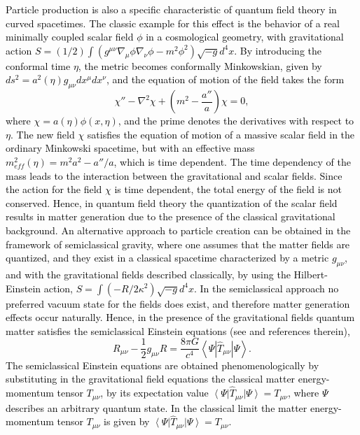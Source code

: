 \documentclass[aps,superscriptaddress, showpacs,preprintnumbers, superscriptaddress, nofootinbibt,twocolumn]{revtex4}
\def\be{\begin{equation}}
\def\ee{\end{equation}}
\newcommand{\te}[1]{\textcolor{black}{#1}}
\begin{document}
\te{Particle production is also a specific characteristic of quantum field theory in curved spacetimes. The classic example for this effect is the behavior of a real minimally coupled  scalar field $\phi$ in a cosmological geometry, with gravitational action $S=(1/2)\int{\left(g^{\mu \nu}\nabla _{\mu}\phi \nabla _{\nu}\phi-m^2\phi^2\right)\sqrt{-g}d^4x}$. By introducing the conformal time $\eta$, the metric becomes conformally Minkowskian, given by $ds^2=a^2(\eta)g_{\mu \nu}dx^{\mu}dx^{\nu}$, and the equation of motion of the field takes the form \cite{Toms}
\be
\chi '' -\nabla ^2 \chi +\left(m^2-\frac{a''}{a}\right)\chi=0,
\ee 
where $\chi =a(\eta)\phi (x,\eta)$, and the prime denotes the derivatives with respect to $\eta$. The new field $\chi $ satisfies the equation of
motion of a massive scalar field in the ordinary Minkowski spacetime, but with an effective mass $m_{eff}^2(\eta)=m^2a^2-a''/a$, which is time dependent. The time dependency of the mass leads to the interaction between the gravitational and scalar fields. Since the action for the field $\chi$ is time dependent,  the total energy of the field is not conserved. Hence, in quantum field theory
the quantization of the scalar field results in matter generation due to the presence of the classical gravitational background.}
\te{
An alternative approach to particle creation can be obtained in the framework of semiclassical gravity,  where one assumes that the matter fields are quantized, and they exist in a classical spacetime characterized by a metric $g_{\mu \nu}$, and with the gravitational fields described classically, by using the Hilbert-Einstein action, $S=\int{\left(-R/2\kappa ^2\right)\sqrt{-g}d^4x}$. In the semiclassical approach no preferred vacuum state for the fields does exist, and therefore matter generation effects occur naturally. Hence, in the presence of the gravitational fields quantum matter satisfies the semiclassical Einstein equations (see \cite{Phys} and references therein),
\be\label{1q}
R_{\mu \nu}-\frac{1}{2}g_{\mu \nu}R=\frac{8\pi G}{c^4}\left\langle\Psi\left|\hat{T}_{\mu\nu}\right|\Psi \right\rangle.
\ee
 The semiclassical Einstein  equations are obtained phenomenologically by substituting in the gravitational field equations the classical matter energy-momentum tensor $T_{\mu\nu}$, by its expectation value $\left<\Psi \right |\hat{T}_{\mu \nu}\left |\Psi \right>=T_{\mu \nu}$, where $\Psi$ describes an arbitrary quantum state. In the classical limit the matter energy-momentum tensor $T_{\mu \nu}$ is given by $\left<\Psi \right |\hat{T}_{\mu \nu}\left |\Psi \right>=T_{\mu \nu}$. }
 
\end{document}
